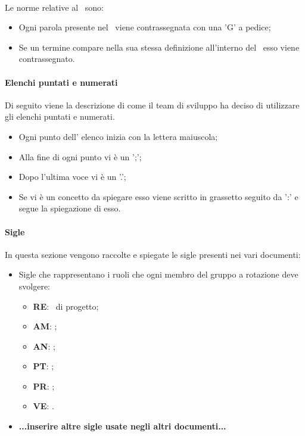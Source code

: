 \paragraph{\docNameGlo}
Le norme relative al \docNameGloLow\ sono:
\begin{itemize}
    \item Ogni parola presente nel \docNameGloLow\ viene contrassegnata con una 'G' a pedice;
    \item Se un termine compare nella sua stessa definizione all'interno del \docNameGloLow\ esso viene contrassegnato.
\end{itemize}

\paragraph{Elenchi puntati e numerati}
Di seguito viene la descrizione di come il team di sviluppo ha deciso di utilizzare gli elenchi puntati e numerati.
\begin {itemize}
    \item Ogni punto dell' elenco inizia con la lettera maiuscola;
    \item Alla fine di ogni punto vi è un ';';
    \item Dopo l'ultima voce vi è un '.';
    \item Se vi è un concetto da spiegare esso viene scritto in grassetto seguito da ':' e segue la spiegazione di esso.
\end {itemize}
\paragraph{Sigle}
In questa sezione vengono raccolte e spiegate le sigle presenti nei vari documenti:
\begin{itemize}
    \item Sigle che rappresentano i ruoli che ogni membro del gruppo a rotazione deve svolgere:
    \begin{itemize}
        \item \textbf{RE}: \roleProjectManager\ di progetto;
        \item \textbf{AM}: \roleAdministrator;
        \item \textbf{AN}: \roleAnalyst;
        \item \textbf{PT}: \roleDesigner;
        \item \textbf{PR}: \roleProgrammer;
        \item \textbf{VE}: \roleVerifier.
    \end {itemize}
    \item\textbf{...inserire altre sigle usate negli altri documenti...}
\end{itemize}
